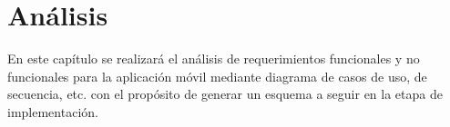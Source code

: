 \chapter{Análisis}
En este capítulo se realizará el análisis de requerimientos funcionales y no funcionales para la aplicación móvil mediante diagrama de casos de uso, de secuencia, etc. con el propósito de generar un esquema a seguir en la etapa de implementación.